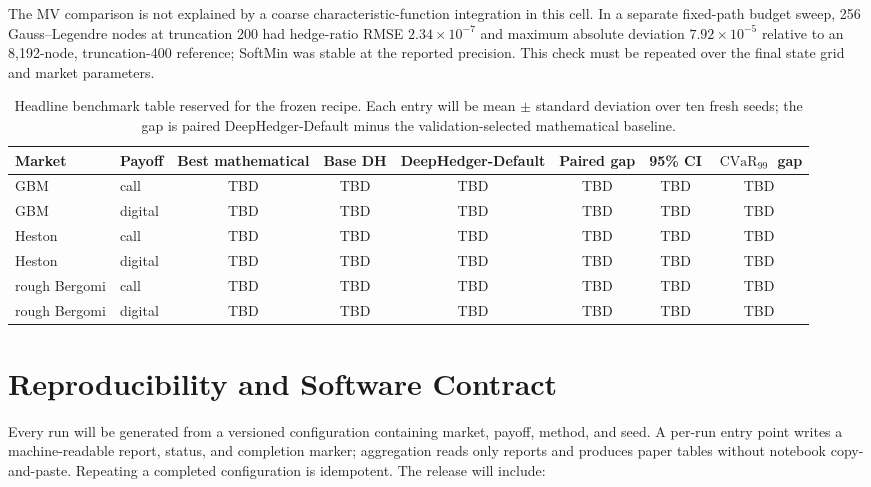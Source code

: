 \documentclass[sigconf,balance=false]{acmart}
\newcommand{\methodname}{DeepHedger-Default}
\newcommand{\cvar}{\operatorname{CVaR}}
\begin{document}
The MV comparison is not explained by a coarse characteristic-function
integration in this cell.  In a separate fixed-path budget sweep, 256
Gauss--Legendre nodes at truncation 200 had hedge-ratio RMSE
$2.34\times10^{-7}$ and maximum absolute deviation $7.92\times10^{-5}$
relative to an 8,192-node, truncation-400 reference; SoftMin was stable at the
reported precision.  This check must be repeated over the final state grid and
market parameters.

\begin{table}[t]
  \caption{Headline benchmark table reserved for the frozen recipe.  Each
  entry will be mean $\pm$ standard deviation over ten fresh seeds; the gap is
  paired \methodname{} minus the validation-selected mathematical baseline.}
  \label{tab:headline}
  \small
  \begin{tabular}{@{}llcccccc@{}}
    \toprule
    Market & Payoff & Best mathematical & Base DH & \methodname &
    Paired gap & 95\% CI & $\cvar_{99}$ gap \\
    \midrule
    GBM & call & TBD & TBD & TBD & TBD & TBD & TBD \\
    GBM & digital & TBD & TBD & TBD & TBD & TBD & TBD \\
    Heston & call & TBD & TBD & TBD & TBD & TBD & TBD \\
    Heston & digital & TBD & TBD & TBD & TBD & TBD & TBD \\
    rough Bergomi & call & TBD & TBD & TBD & TBD & TBD & TBD \\
    rough Bergomi & digital & TBD & TBD & TBD & TBD & TBD & TBD \\
    \bottomrule
  \end{tabular}
\end{table}

\section{Reproducibility and Software Contract}

Every run will be generated from a versioned configuration containing market,
payoff, method, and seed.  A per-run entry point writes a machine-readable
report, status, and completion marker; aggregation reads only reports and
produces paper tables without notebook copy-and-paste.  Repeating a completed
configuration is idempotent.  The release will include:
\end{document}
